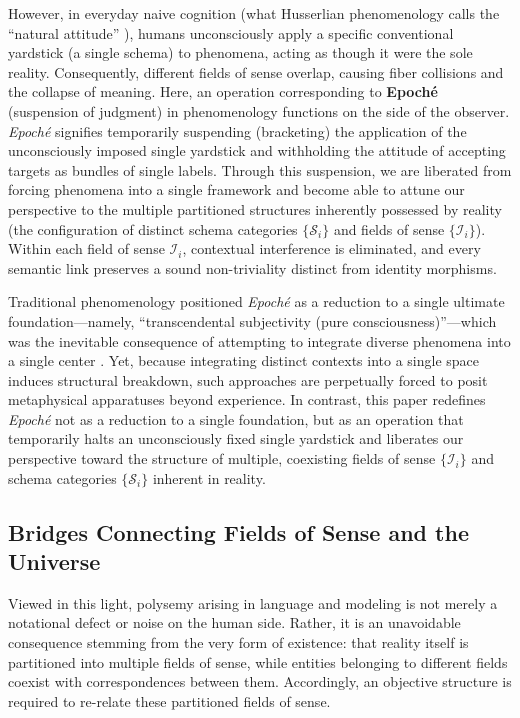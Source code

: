 \documentclass[11pt,a4paper]{article}
\theoremstyle{definition}
\theoremstyle{plain}
\begin{document}
However, in everyday naive cognition (what Husserlian phenomenology calls the ``natural attitude'' \cite{husserl1913}), humans unconsciously apply a specific conventional yardstick (a single schema) to phenomena, acting as though it were the sole reality. Consequently, different fields of sense overlap, causing fiber collisions and the collapse of meaning. Here, an operation corresponding to \textbf{Epoch\'e} (suspension of judgment) in phenomenology functions on the side of the observer. \textit{Epoch\'e} signifies temporarily suspending (bracketing) the application of the unconsciously imposed single yardstick and withholding the attitude of accepting targets as bundles of single labels. Through this suspension, we are liberated from forcing phenomena into a single framework and become able to attune our perspective to the multiple partitioned structures inherently possessed by reality (the configuration of distinct schema categories $\{\mathcal{S}_i\}$ and fields of sense $\{\mathcal{I}_i\}$). Within each field of sense $\mathcal{I}_{i}$, contextual interference is eliminated, and every semantic link preserves a sound non-triviality distinct from identity morphisms.

Traditional phenomenology positioned \textit{Epoch\'e} as a reduction to a single ultimate foundation---namely, ``transcendental subjectivity (pure consciousness)''---which was the inevitable consequence of attempting to integrate diverse phenomena into a single center \cite{husserl1913}. Yet, because integrating distinct contexts into a single space induces structural breakdown, such approaches are perpetually forced to posit metaphysical apparatuses beyond experience. In contrast, this paper redefines \textit{Epoch\'e} not as a reduction to a single foundation, but as an operation that temporarily halts an unconsciously fixed single yardstick and liberates our perspective toward the structure of multiple, coexisting fields of sense $\{\mathcal{I}_i\}$ and schema categories $\{\mathcal{S}_i\}$ inherent in reality.

\subsection{Bridges Connecting Fields of Sense and the Universe}

Viewed in this light, polysemy arising in language and modeling is not merely a notational defect or noise on the human side. Rather, it is an unavoidable consequence stemming from the very form of existence: that reality itself is partitioned into multiple fields of sense, while entities belonging to different fields coexist with correspondences between them. Accordingly, an objective structure is required to re-relate these partitioned fields of sense.
\end{document}
